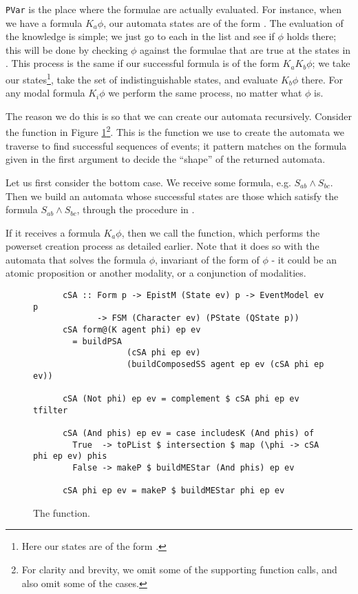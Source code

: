 \documentclass[10pt, a4paper]{report}
\begin{document}
\texttt{PVar} is the place where the formulae are actually
evaluated. For instance, when we have a formula $K_a \phi$, our automata states
are of the form . The evaluation of the knowledge
is simple; we just go to each  in the list and see if $\phi$ holds
there; this will be done by checking $\phi$ against the formulae that are true
at the states in . This process is the same if our successful formula
is of the form $K_a K_b \phi$; we take our states\footnote{Here our states are
  of the form .}, take the set of indistinguishable states, and evaluate $K_b \phi$
there. For any modal formula $K_i \phi$ we perform the same process, no matter
what $\phi$ is.



The reason we do this is so that we can create our automata recursively.
Consider the function in Figure \ref{fig:createSolvingAutomata}\footnote{For clarity
  and brevity, we omit some of the supporting function calls, and also omit some
  of the cases.}. This is the function we use to create the automata we traverse
to find successful sequences of events; it pattern matches on the formula given
in the first argument to decide the ``shape'' of the returned automata.

Let us first consider the bottom case. We receive some formula, e.g. $S_{ab}
\land S_{bc}$. Then we build an automata \mestar whose successful states are
those which satisfy the formula $S_{ab} \land S_{bc}$, through the procedure in
. 

If it receives a formula $K_a \phi$, then we call the 
function, which performs the powerset creation process as detailed earlier. Note
that it does so with the automata that solves the formula $\phi$, invariant of
the form of $\phi$ - it could be an atomic proposition or another modality, or a
conjunction of modalities. 

\begin{figure}[h]
  \centering
    \begin{verbatim}
      cSA :: Form p -> EpistM (State ev) p -> EventModel ev p
             -> FSM (Character ev) (PState (QState p))
      cSA form@(K agent phi) ep ev
        = buildPSA 
                   (cSA phi ep ev) 
                   (buildComposedSS agent ep ev (cSA phi ep ev)) 

      cSA (Not phi) ep ev = complement $ cSA phi ep ev tfilter

      cSA (And phis) ep ev = case includesK (And phis) of
        True  -> toPList $ intersection $ map (\phi -> cSA phi ep ev) phis
        False -> makeP $ buildMEStar (And phis) ep ev

      cSA phi ep ev = makeP $ buildMEStar phi ep ev
    \end{verbatim}
  \caption{The  function.}
  \label{fig:createSolvingAutomata}
\end{figure}
\end{document}
